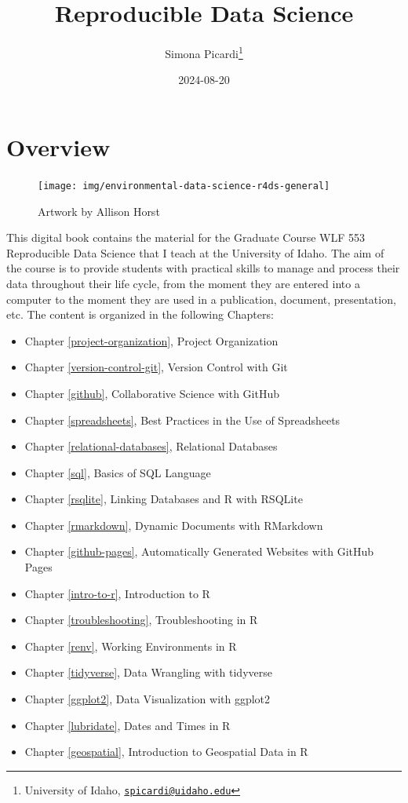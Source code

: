 \documentclass[
]{book}
\title{Reproducible Data Science}
\author{Simona Picardi\footnote{University of Idaho, \href{mailto:spicardi@uidaho.edu}{\nolinkurl{spicardi@uidaho.edu}}}}
\date{2024-08-20}
\providecommand{\tightlist}{%
  \setlength{\itemsep}{0pt}\setlength{\parskip}{0pt}}
\begin{document}
\maketitle

{
\setcounter{tocdepth}{1}
\tableofcontents
}
\hypertarget{overview}{%
\chapter*{Overview}\label{overview}}

\begin{figure}

{\centering \texttt{[image: img/environmental-data-science-r4ds-general]} 

}

\caption{Artwork by Allison Horst}\label{fig:art1}
\end{figure}

This digital book contains the material for the Graduate Course WLF 553 Reproducible Data Science that I teach at the University of Idaho. The aim of the course is to provide students with practical skills to manage and process their data throughout their life cycle, from the moment they are entered into a computer to the moment they are used in a publication, document, presentation, etc. The content is organized in the following Chapters:

\begin{itemize}
\tightlist
\item
  Chapter \ref{project-organization}, Project Organization
\item
  Chapter \ref{version-control-git}, Version Control with Git
\item
  Chapter \ref{github}, Collaborative Science with GitHub
\item
  Chapter \ref{spreadsheets}, Best Practices in the Use of Spreadsheets
\item
  Chapter \ref{relational-databases}, Relational Databases
\item
  Chapter \ref{sql}, Basics of SQL Language
\item
  Chapter \ref{rsqlite}, Linking Databases and R with RSQLite
\item
  Chapter \ref{rmarkdown}, Dynamic Documents with RMarkdown
\item
  Chapter \ref{github-pages}, Automatically Generated Websites with GitHub Pages
\item
  Chapter \ref{intro-to-r}, Introduction to R
\item
  Chapter \ref{troubleshooting}, Troubleshooting in R
\item
  Chapter \ref{renv}, Working Environments in R
\item
  Chapter \ref{tidyverse}, Data Wrangling with tidyverse
\item
  Chapter \ref{ggplot2}, Data Visualization with ggplot2
\item
  Chapter \ref{lubridate}, Dates and Times in R
\item
  Chapter \ref{geospatial}, Introduction to Geospatial Data in R
\end{itemize}
\end{document}
